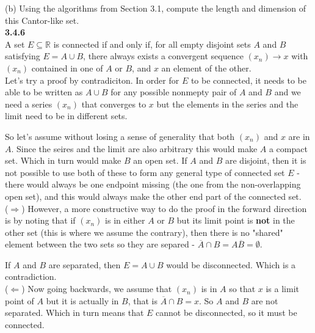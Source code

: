 (b) Using the algorithms from Section 3.1, compute the length and dimension of this Cantor-like set.
\\


\textbf{3.4.6}
\\

A set $E \subseteq \mathbb{R}$ is connected if and only if,
for all empty disjoint sets $A$ and $B$ satisfying $E = A \cup B$,
there always exists a convergent sequence $(x_n) \rightarrow x$
with $(x_n)$ contained in one of $A$ or $B$, and $x$ an element of the other.
\\

Let's try a proof by contradiciton.
In order for $E$ to be connected, it needs to be able to be written as $A \cup B$ for any possible nonmepty pair of $A$ and $B$
and we need a series $(x_n)$ that converges to $x$ but the elements in the series and the limit need to be in different sets.

So let's assume without losing a sense of generality that both $(x_n)$ and $x$ are in $A$.
Since the seires and the limit are also arbitrary this would make $A$ a compact set.
Which in turn would make $B$ an open set.
If $A$ and $B$ are disjoint, then it is not possible to use both of these to form any general type of
connected set $E$ - there would always be one endpoint missing (the one from the non-overlapping open set),
and this would always make the other end part of the connected set.
\\

($\Rightarrow$) However, a more constructive way to do the proof in the forward direction is by noting that if
$(x_n)$ is in either $A$ or $B$ but its limit point is \textbf{not} in the other set (this is where we assume the contrary),
then there is no "shared"
element between the two sets so they are separed - $\overline{A} \cap B = A \overline{B} = \emptyset$.

If $A$ and $B$ are separated, then $E = A \cup B$ would be disconnected.
Which is a contradiction.
\\

($\Leftarrow$) Now going backwards, we assume that $(x_n)$ is in $A$ so that $x$ is a limit point of $A$
but it is actually in $B$, that is $\overline{A} \cap B = x$.
So $A$ and $B$ are not separated.
Which in turn means that $E$ cannot be disconnected, so it must be connected.
\\~\\